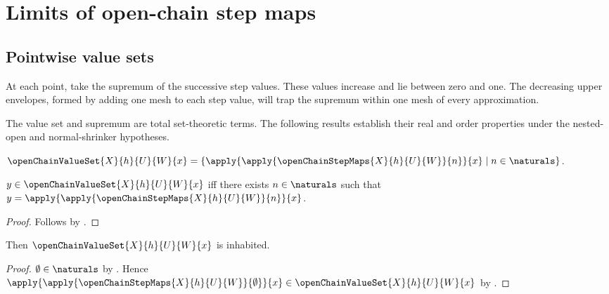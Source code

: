 \section{Limits of open-chain step maps}








\subsection{Pointwise value sets}

At each point, take the supremum of the successive step values. These values
increase and lie between zero and one. The decreasing upper envelopes, formed
by adding one mesh to each step value, will trap the supremum within one mesh
of every approximation.

The value set and supremum are total set-theoretic terms. The following
results establish their real and order properties under the nested-open and
normal-shrinker hypotheses.

\begin{definition}\label{open_chain_value_set}
    $\openChainValueSet{X}{h}{U}{W}{x}
        =\{\apply{\apply{\openChainStepMaps{X}{h}{U}{W}}{n}}{x}
            \mid n\in\naturals\}$.
\end{definition}

\begin{proposition}\label{open_chain_value_set_iff}
    $y\in\openChainValueSet{X}{h}{U}{W}{x}$ iff
        there exists $n\in\naturals$ such that
            $y=\apply{\apply{\openChainStepMaps{X}{h}{U}{W}}{n}}{x}$.
\end{proposition}
\begin{proof}
    Follows by .
\end{proof}

\begin{proposition}\label{open_chain_value_set_inhabited}
    Then $\openChainValueSet{X}{h}{U}{W}{x}$ is inhabited.
\end{proposition}
\begin{proof}
    $\emptyset\in\naturals$ by .
    Hence
        $\apply{\apply{\openChainStepMaps{X}{h}{U}{W}}{\emptyset}}{x}
            \in\openChainValueSet{X}{h}{U}{W}{x}$
        by .
\end{proof}

